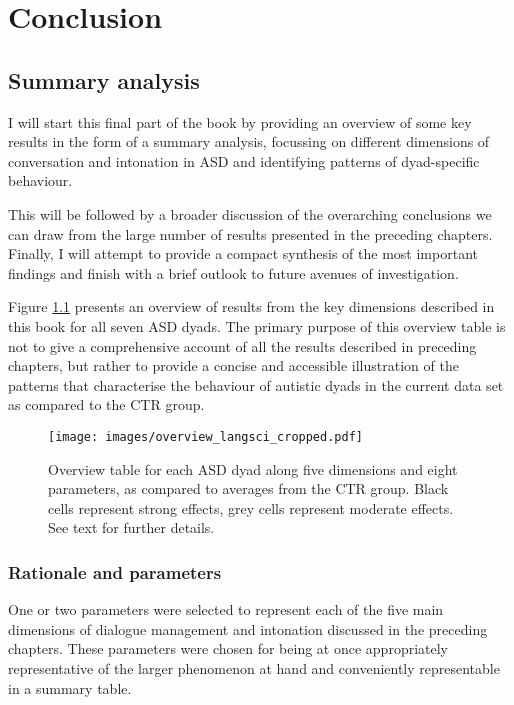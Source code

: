 \chapter{Conclusion} \label{conclusion}

\section{Summary analysis}\label{sec:Conclusion_SummaryAnalysis}

I will start this final part of the book by providing an overview of some key results in the form of a summary analysis, focussing on different dimensions of conversation and intonation in ASD and identifying patterns of dyad-specific behaviour.

This will be followed by a broader discussion of the overarching conclusions we can draw from the large number of results presented in the preceding chapters. Finally, I will attempt to provide a compact synthesis of the most important findings and finish with a brief outlook to future avenues of investigation.

Figure \ref{fig:OverTable} presents an overview of results from the key dimensions described in this book for all seven ASD dyads. The primary purpose of this overview table is not to give a comprehensive account of all the results described in preceding chapters, but rather to provide a concise and accessible illustration of the patterns that characterise the behaviour of autistic dyads in the current data set as compared to the CTR group.



\begin{figure}

\texttt{[image: images/overview\_langsci\_cropped.pdf]} \hfill{}

\caption{Overview table for each ASD dyad along five dimensions and eight parameters, as compared to averages from the CTR group. Black cells represent strong effects, grey cells represent moderate effects. See text for further details.}\label{fig:OverTable}
\end{figure}



\subsection{Rationale and parameters}\label{Conclusion_SummaryAnalysis_rationale}

One or two parameters were selected to represent each of the five main dimensions of dialogue management and intonation discussed in the preceding chapters. These parameters were chosen for being at once appropriately representative of the larger phenomenon at hand and conveniently representable in a summary table.

